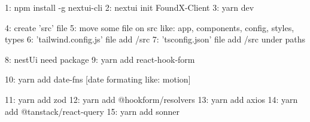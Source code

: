 1: npm install -g nextui-cli
2: nextui init FoundX-Client
3: yarn dev


4: create 'src' file
5: move some file on src like: app, components, config, styles, types
6: 'tailwind.config.js' file add /src
7: 'tsconfig.json' file add /src under paths

8: nestUi need package
9: yarn add react-hook-form

10: yarn add date-fns [date formating like: motion]

11: yarn add zod
12: yarn add @hookform/resolvers
13: yarn add axios
14: yarn add @tanstack/react-query
15: yarn add sonner